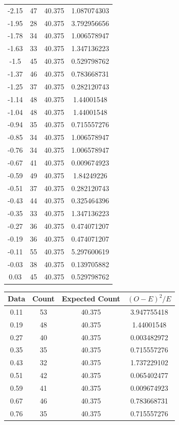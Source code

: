 \begin{center}
{\begin{tabular}{|c|c|c|c|}
-2.15	&	47	&	40.375	&	1.087074303	\\
-1.95	&	28	&	40.375	&	3.792956656	\\
-1.78	&	34	&	40.375	&	1.006578947	\\ 
-1.63	&	33	&	40.375	&	1.347136223	\\
-1.5	&	45	&	40.375	&	0.529798762	\\
-1.37	&	46	&	40.375	&	0.783668731	\\
-1.25	&	37	&	40.375	&	0.282120743	\\
-1.14	&	48	&	40.375	&	1.44001548	\\
-1.04	&	48	&	40.375	&	1.44001548	\\
-0.94	&	35	&	40.375	&	0.715557276	\\
-0.85	&	34	&	40.375	&	1.006578947	\\
-0.76	&	34	&	40.375	&	1.006578947	\\
-0.67	&	41	&	40.375	&	0.009674923	\\
-0.59	&	49	&	40.375	&	1.84249226	\\
-0.51	&	37	&	40.375	&	0.282120743	\\
-0.43	&	44	&	40.375	&	0.325464396	\\
-0.35	&	33	&	40.375	&	1.347136223	\\
-0.27	&	36	&	40.375	&	0.474071207	\\
-0.19	&	36	&	40.375	&	0.474071207	\\
-0.11	&	55	&	40.375	&	5.297600619	\\
-0.03	&	38	&	40.375	&	0.139705882	\\
0.03	&	45	&	40.375	&	0.529798762	\\
\hline
\end{tabular}
}
{\scriptsize
\begin{tabular}{|c|c|c|c|}\hline
Data	& Count&	Expected Count&	$(O-E)^2/E$\\ \hline
0.11	&	53	&	40.375	&	3.947755418	\\
0.19	&	48	&	40.375	&	1.44001548	\\
0.27	&	40	&	40.375	&	0.003482972	\\
0.35	&	35	&	40.375	&	0.715557276	\\
0.43	&	32	&	40.375	&	1.737229102	\\
0.51	&	42	&	40.375	&	0.065402477	\\
0.59	&	41	&	40.375	&	0.009674923	\\
0.67	&	46	&	40.375	&	0.783668731	\\
0.76	&	35	&	40.375	&	0.715557276	\\

\end{tabular}}
\end{center}
